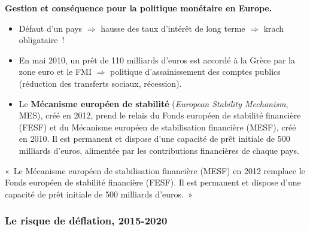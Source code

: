 \textbf{Gestion et conséquence pour la politique monétaire en Europe.}
\begin{itemize}
  \item Défaut d'un pays $\Rightarrow$ hausse des taux d'intérêt de long terme
    $\Rightarrow$ krach obligataire~!
  \item En mai 2010, un prêt de 110 milliards d'euros est accordé à la Grèce par la zone
    euro et le FMI $\Rightarrow$ politique d'assainissement des comptes publics
    (réduction des transferts sociaux, récession).
  \item Le \textbf{Mécanisme européen de stabilité} (\textit{European Stability
    Mechanism}, MES), créé en 2012, prend le relais du Fonds européen de stabilité
    financière (FESF) et du Mécanisme européen de stabilisation financière (MESF), créé
    en 2010. Il est permanent et dispose d'une capacité de prêt
    initiale de 500 milliards d'euros, alimentée par les contributions financières de
    chaque pays.
\end{itemize}

\begin{remark}
  «~Le Mécanisme européen de stabilisation financière (MESF) en 2012 remplace le Fonds
  européen de stabilité financière (FESF). Il est permanent et dispose d'une capacité
  de prêt initiale de 500 milliards d'euros.~»
\end{remark}

\subsubsection{Le risque de déflation, 2015-2020}

